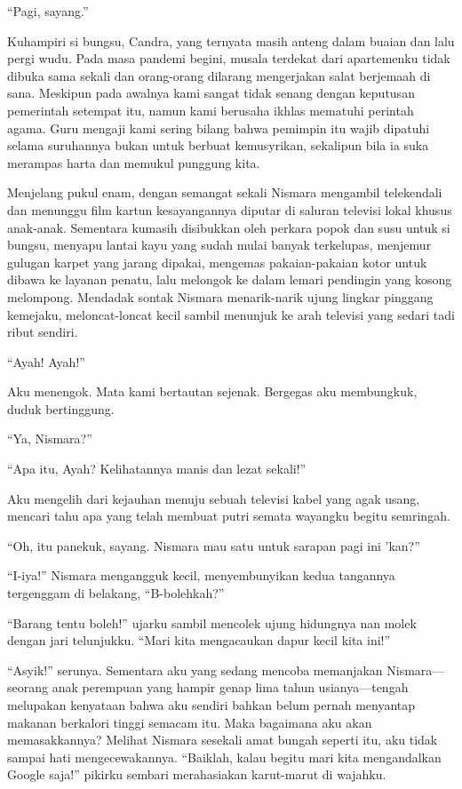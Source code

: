 \documentclass[smalldemyvopaper,11pt,twoside,onecolumn,openright,extrafontsizes]{memoir}
\begin{document}
``Pagi, sayang.''


Kuhampiri si bungsu, Candra, yang ternyata masih anteng dalam buaian dan lalu pergi wudu. Pada masa pandemi begini, musala terdekat dari apartemenku tidak dibuka sama sekali dan orang-orang dilarang mengerjakan salat berjemaah di sana. Meskipun pada awalnya kami sangat tidak senang dengan keputusan pemerintah setempat itu, namun kami berusaha ikhlas mematuhi perintah agama. Guru mengaji kami sering bilang bahwa pemimpin itu wajib dipatuhi selama suruhannya bukan untuk berbuat kemusyrikan, sekalipun bila ia suka merampas harta dan memukul punggung kita.


Menjelang pukul enam, dengan semangat sekali Nismara mengambil telekendali dan menunggu film kartun kesayangannya diputar di saluran televisi lokal khusus anak-anak. Sementara kumasih disibukkan oleh perkara popok dan susu untuk si bungsu, menyapu lantai kayu yang sudah mulai banyak terkelupas, menjemur gulugan karpet yang jarang dipakai, mengemas pakaian-pakaian kotor untuk dibawa ke layanan penatu, lalu melongok ke dalam lemari pendingin yang kosong melompong. Mendadak sontak Nismara menarik-narik ujung lingkar pinggang kemejaku, meloncat-loncat kecil sambil menunjuk ke arah televisi yang sedari tadi ribut sendiri.

``Ayah! Ayah!''

Aku menengok. Mata kami bertautan sejenak. Bergegas aku membungkuk, duduk bertinggung.

``Ya, Nismara?''

``Apa itu, Ayah? Kelihatannya manis dan lezat sekali!''

Aku mengelih dari kejauhan menuju sebuah televisi kabel yang agak usang, mencari tahu apa yang telah membuat putri semata wayangku begitu semringah.

``Oh, itu panekuk, sayang. Nismara mau satu untuk sarapan pagi ini 'kan?''

``I-iya!'' Nismara mengangguk kecil, menyembunyikan kedua tangannya tergenggam di belakang, ``B-bolehkah?''

``Barang tentu boleh!'' ujarku sambil mencolek ujung hidungnya nan molek dengan jari telunjukku. ``Mari kita mengacaukan dapur kecil kita ini!''


``Asyik!'' serunya. Sementara aku yang sedang mencoba memanjakan Nismara---seorang anak perempuan yang hampir genap lima tahun usianya---tengah melupakan kenyataan bahwa aku sendiri bahkan belum pernah menyantap makanan berkalori tinggi semacam itu. Maka bagaimana aku akan memasakkannya? Melihat Nismara sesekali amat bungah seperti itu, aku tidak sampai hati mengecewakannya. ``Baiklah, kalau begitu mari kita mengandalkan Google saja!'' pikirku sembari merahasiakan karut-marut di wajahku.
\end{document}
